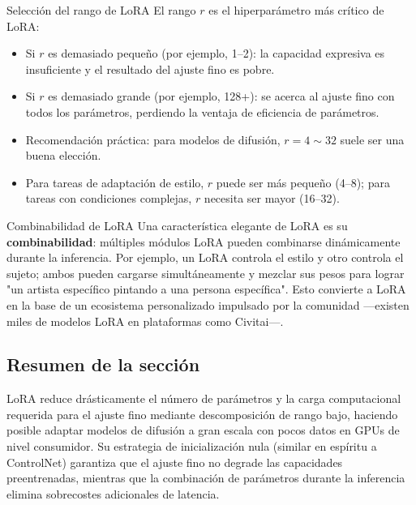 \begin{warningbox}{Selección del rango de LoRA}
El rango $r$ es el hiperparámetro más crítico de LoRA:
\begin{itemize}
    \item Si $r$ es demasiado pequeño (por ejemplo, 1--2): la capacidad expresiva es insuficiente y el resultado del ajuste fino es pobre.
    \item Si $r$ es demasiado grande (por ejemplo, 128+): se acerca al ajuste fino con todos los parámetros, perdiendo la ventaja de eficiencia de parámetros.
    \item Recomendación práctica: para modelos de difusión, $r = 4 \sim 32$ suele ser una buena elección.
    \item Para tareas de adaptación de estilo, $r$ puede ser más pequeño (4--8); para tareas con condiciones complejas, $r$ necesita ser mayor (16--32).
\end{itemize}
\end{warningbox}

\begin{knowledgebox}{Combinabilidad de LoRA}
Una característica elegante de LoRA es su \textbf{combinabilidad}: múltiples módulos LoRA pueden combinarse dinámicamente durante la inferencia. Por ejemplo, un LoRA controla el estilo y otro controla el sujeto; ambos pueden cargarse simultáneamente y mezclar sus pesos para lograr "un artista específico pintando a una persona específica". Esto convierte a LoRA en la base de un ecosistema personalizado impulsado por la comunidad —existen miles de modelos LoRA en plataformas como Civitai—.
\end{knowledgebox}

\subsection{Resumen de la sección}

LoRA reduce drásticamente el número de parámetros y la carga computacional requerida para el ajuste fino mediante descomposición de rango bajo, haciendo posible adaptar modelos de difusión a gran escala con pocos datos en GPUs de nivel consumidor. Su estrategia de inicialización nula (similar en espíritu a ControlNet) garantiza que el ajuste fino no degrade las capacidades preentrenadas, mientras que la combinación de parámetros durante la inferencia elimina sobrecostes adicionales de latencia.

\newpage
